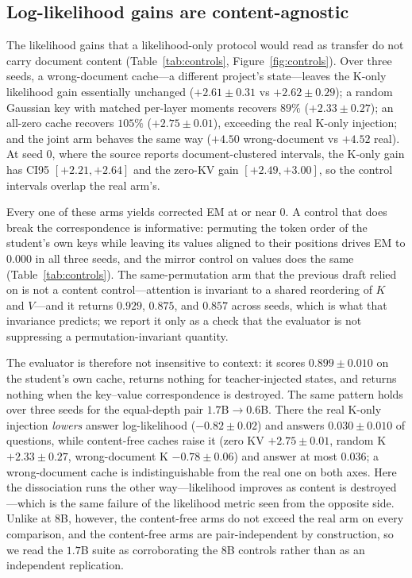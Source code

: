 \documentclass[11pt]{article}
\begin{document}
\subsection{Log-likelihood gains are content-agnostic}
\label{sec:controls}
The likelihood gains that a likelihood-only protocol would read as transfer do
not carry document content (Table~\ref{tab:controls},
Figure~\ref{fig:controls}). Over three seeds, a wrong-document cache---a different
project's state---leaves the K-only likelihood gain essentially unchanged
($+2.61 \pm 0.31$ vs $+2.62 \pm 0.29$); a random Gaussian key with matched
per-layer moments recovers $89\%$ ($+2.33 \pm 0.27$); an all-zero cache recovers
$105\%$ ($+2.75 \pm 0.01$), exceeding the real K-only injection; and the joint
arm behaves the same way ($+4.50$ wrong-document vs $+4.52$ real). At seed 0,
where the source reports document-clustered intervals, the K-only gain has CI95
$[+2.21, +2.64]$ and the zero-KV gain $[+2.49, +3.00]$, so the control intervals
overlap the real arm's.

Every one of these arms yields corrected EM at or near $0$. A control that does
break the correspondence is informative: permuting the token order of the
student's own keys while leaving its values aligned to their positions drives EM
to $0.000$ in all three seeds, and the mirror control on values does the same
(Table~\ref{tab:controls}). The same-permutation arm that the previous draft
relied on is not a content control---attention is invariant to a shared
reordering of $K$ and $V$---and it returns $0.929$, $0.875$, and $0.857$ across
seeds, which is what that invariance predicts; we report it only as a check that
the evaluator is not suppressing a permutation-invariant quantity.

The evaluator is therefore not insensitive to context: it scores
$0.899 \pm 0.010$ on the student's own cache, returns nothing for
teacher-injected states, and returns nothing when the key--value correspondence
is destroyed. The same pattern holds over three seeds for the equal-depth pair
$1.7$B$\to0.6$B. There the real K-only injection \emph{lowers} answer
log-likelihood ($-0.82 \pm 0.02$) and answers $0.030 \pm 0.010$ of questions,
while content-free caches raise it (zero KV $+2.75 \pm 0.01$, random K
$+2.33 \pm 0.27$, wrong-document K $-0.78 \pm 0.06$) and answer at most $0.036$;
a wrong-document cache is indistinguishable from the real one on both axes. Here
the dissociation runs the other way---likelihood improves as content is
destroyed---which is the same failure of the likelihood metric seen from the
opposite side. Unlike at $8$B, however, the content-free arms do not exceed the
real arm on every comparison, and the content-free arms are pair-independent by
construction, so we read the $1.7$B suite as corroborating the $8$B controls
rather than as an independent replication.
\end{document}
